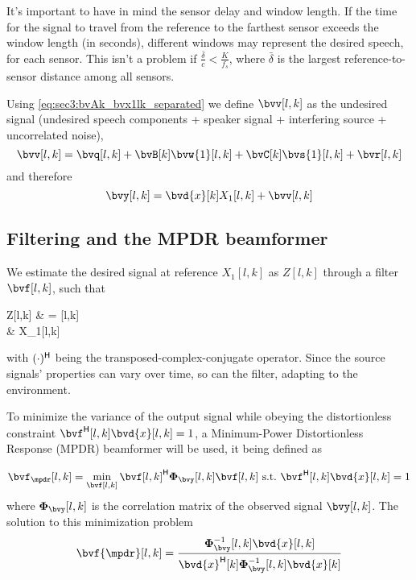 It's important to have in mind the sensor delay and window length. If the time for the signal to travel from the reference to the farthest sensor exceeds the window length (in seconds), different windows may represent the desired speech, for each sensor. This isn't a problem if $\frac{\bar{\delta}}{c} < \frac{K}{f_s}$, where $\bar{\delta}$ is the largest reference-to-sensor distance among all sensors.

Using \cref{eq:sec3:bvAk_bvx1lk_separated} we define $\bvv[l,k]$ as the undesired signal (undesired speech components + speaker signal + interfering source + uncorrelated noise),
\begin{equation}
	\label{eq:sec3:def_undes_sig_bvwlk}
	\bvv[l,k] = \bvq[l,k] + \bvB[k] \bvw{1}[l,k] + \bvC[k] \bvs{1}[l,k] + \bvr[l,k]
\end{equation}
and therefore
\begin{equation}
	\label{eq:sec3:time-freq_model_final}
	\bvy[l,k] = \bvd{x}[k] X_1[l,k] + \bvv[l,k]
\end{equation}

\subsection{Filtering and the MPDR beamformer}
\label{subsec:sec3:filtering_mpdr}
We estimate the desired signal at reference $X_1[l,k]$ as $Z[l,k]$ through a filter $\bvf[l,k]$, such that
\begin{equations}
	Z[l,k]
	& = \he{\bvf}[l,k] \bvy[l,k] \\
	& \approx X_1[l,k]
\end{equations}
with $\he{(\cdot)}$ being the transposed-complex-conjugate operator. Since the source signals' properties can vary over time, so can the filter, adapting to the environment.

To minimize the variance of the output signal while obeying the distortionless constraint $\he{\bvf}[l,k] \bvd{x}[l,k] = 1$, a Minimum-Power Distortionless Response (MPDR) beamformer will be used, it being defined as

\begin{equation}
	\label{eq:sec3:minimization_problem_mpdr}
	\bvf_{\mpdr}[l,k] = \min_{\bvf[l,k]} \he{\bvf[l,k]} \Corr{\bvy}[l,k] \bvf[l,k]~\text{s.t.}~\he{\bvf}[l,k] \bvd{x}[l,k] = 1
\end{equation}
where $\Corr{\bvy}[l,k]$ is the correlation matrix of the observed signal $\bvy[l,k]$. The solution to this minimization problem 
\begin{equation}
	\label{eq:sec3:solution_mpdr_beamformer}
	\bvf{\mpdr}[l,k] = \frac{\iCorr{\bvy}[l,k] \bvd{x}[l,k]}{\he{\bvd{x}}[k] \iCorr{\bvy}[l,k] \bvd{x}[k]}
\end{equation}

